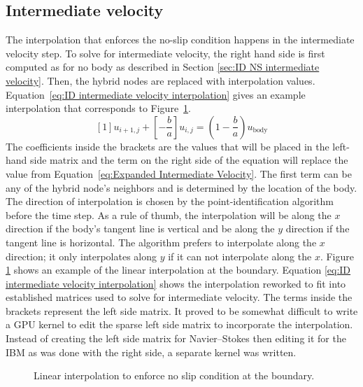 \subsection{Intermediate velocity}
\label{sec:ID fadlun intermediate velocity}
The interpolation that enforces the no-slip condition happens in the intermediate velocity step. 
To solve for intermediate velocity, the right hand side is first computed as for no body as described in Section \ref{sec:ID NS intermediate velocity}. 
Then, the hybrid nodes are replaced with interpolation values. 
Equation~\eqref{eq:ID intermediate velocity interpolation} gives an example interpolation that corresponds to Figure~\ref{fig:ID linear interpolation}. 
\begin{equation}
\left[1\right]u_{i+1,j} + \left[-\frac{b}{a}\right]u_{i,j} = \left(1-\frac{b}{a}\right)u_{\text{body}}
\label{eq:ID intermediate velocity interpolation}
\end{equation}
The coefficients inside the brackets are the values that will be placed in the left-hand side matrix and the term on the right side of the equation will replace the value from Equation~\eqref{eq:Expanded Intermediate Velocity}. 
The first term can be any of the hybrid node's neighbors and is determined by the location of the body. 
The direction of interpolation is chosen by the point-identification algorithm before the time step. 
As a rule of thumb, the interpolation will be along the $x$ direction if the body's tangent line is vertical and be along the $y$ direction if the tangent line is horizontal. 
The algorithm prefers to interpolate along the $x$ direction; it only interpolates along $y$ if it can not interpolate along the $x$. 
Figure \ref{fig:ID linear interpolation} shows an example of the linear interpolation at the boundary. 
Equation \eqref{eq:ID intermediate velocity interpolation} shows the interpolation reworked to fit into established matrices used to solve for intermediate velocity. 
The terms inside the brackets represent the left side matrix. 
It proved to be somewhat difficult to write a GPU kernel to edit the sparse left side matrix to incorporate the interpolation. 
Instead of creating the left side matrix for Navier--Stokes then editing it for the IBM as was done with the right side, a separate kernel was written. 

\begin{figure}[!htb]
	\centering
	
	\caption{Linear interpolation to enforce no slip condition at the boundary.}
	\label{fig:ID linear interpolation}
\end{figure}

